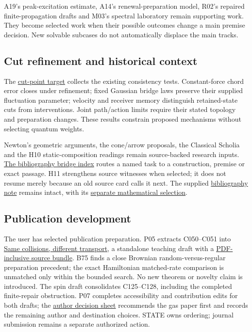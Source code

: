 \documentclass[11pt,a4paper]{article}
\begin{document}
A19's peak-excitation estimate, A14's renewal-preparation model, R02's
repaired finite-propagation drafts and M03's spectral laboratory remain
supporting work. They become selected work when their possible outcomes
change a main premise decision. New solvable subcases do not
automatically displace the main tracks.

\hypertarget{cut-refinement-and-historical-context}{%
\subsection{Cut refinement and historical
context}\label{cut-refinement-and-historical-context}}

The \href{CUT_POINT_TARGET.md}{cut-point target} collects the existing
consistency tests. Constant-force chord error closes under refinement;
fixed Gaussian bridge laws preserve their supplied fluctuation
parameter; velocity and receiver memory distinguish retained-state cuts
from interventions. Joint path/action limits require their stated
topology and preparation changes. These results constrain proposed
mechanisms without selecting quantum weights.

Newton's geometric arguments, the cone/arrow proposals, the Classical
Scholia and the H10 static-composition readings remain source-backed
research inputs. \href{../references/IDEA_BRIDGES.md}{The bibliography
bridge index} routes a named task to a construction, premise or exact
passage. H11 strengthens source witnesses when selected; it does not
resume merely because an old source card calls it next. The supplied
\href{../references/nota_unificada.md}{bibliography note} remains
intact, with its
\href{../references/nota_unificada-seleccion-matematica.md}{separate
mathematical selection}.

\hypertarget{publication-development}{%
\subsection{Publication development}\label{publication-development}}

The user has selected publication preparation. P05 extracts C050--C051
into \href{../out/papers/same-collisions-different-transport.pdf}{Same
collisions, different transport}, a standalone teaching draft with a
\href{../out/publications/same-collisions-different-transport.zip}{PDF-inclusive
source bundle}. B75 finds a close Brownian random-versus-regular
preparation precedent; the exact Hamiltonian matched-rate comparison is
unmatched only within the bounded search. No new theorem or novelty
claim is introduced. The spin draft consolidates C125--C128, including
the completed finite-repair obstruction. P07 completes accessibility and
contribution edits for both drafts; the
\href{../reviews/publication-readiness-P07.md}{author decision sheet}
recommends the gas paper first and records the remaining author and
destination choices. STATE owns ordering; journal submission remains a
separate authorized action.
\end{document}
